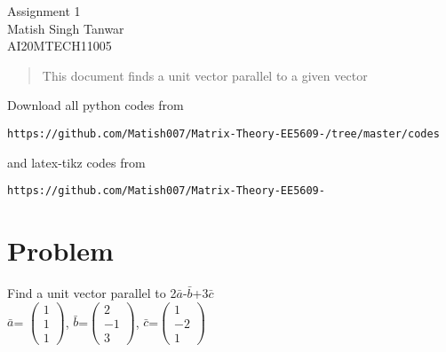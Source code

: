 \documentclass[journal,12pt,twocolumn]{IEEEtran}
\begin{document}
\begin{center}
\huge Assignment 1\\

\large Matish Singh Tanwar\\
\large AI20MTECH11005\\
\end{center}
\vspace{1.0cm}
\begin{abstract}
This document finds a unit vector parallel to a given vector
\end{abstract}
\vspace{0.5cm}
Download all python codes from 
\begin{lstlisting}
https://github.com/Matish007/Matrix-Theory-EE5609-/tree/master/codes
\end{lstlisting}
%
and latex-tikz codes from 
\begin{lstlisting}
https://github.com/Matish007/Matrix-Theory-EE5609-
\end{lstlisting}
%
\vspace{0.5cm}
\section{Problem}
\vspace{1mm}Find a unit vector parallel to \vspace{1.0mm}2$\bar{a}$-$\bar{b}$+3$\bar{c}$\\
 \vspace{0.5cm} $\bar{a}$= $\begin{pmatrix}1 \\1 \\1\end{pmatrix}$, $\bar{b}$=$\begin{pmatrix}2 \\-1 \\3\end{pmatrix}$, $\bar{c}$=$\begin{pmatrix}1 \\-2 \\1\end{pmatrix}$
\end{document}
